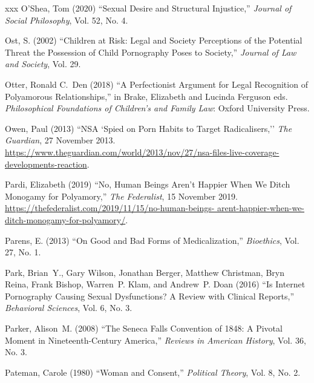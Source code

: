 \documentclass[]{jlreq} \usepackage{mystyle}
\begin{document}
\begin{thebibliography}{xxx}
O'Shea, Tom (2020) ``Sexual Desire and Structural Injustice,'' \textit{ Journal
  of Social Philosophy}, Vol. 52, No. 4.

Ost, S. (2002) ``Children at Risk: Legal and Society Perceptions of the
  Potential Threat the Possession of Child Pornography Poses to Society,''
  \textit{ Journal of Law and Society}, Vol. 29.

Otter, Ronald C.~Den (2018) ``A Perfectionist Argument for Legal Recognition of
  Polyamorous Relationships,'' in Brake, Elizabeth and Lucinda Ferguson eds.
  \textit{ Philosophical Foundations of Children's and Family Law}: Oxford
  University Press.

Owen, Paul (2013) ``NSA `Spied on Porn Habits to Target Radicalisers,''
  \emph{The Guardian}, 27 November 2013.
  \url{https://www.theguardian.com/world/2013/nov/27/nsa-files-live-coverage-developments-reaction}.

Pardi, Elizabeth (2019) ``No, Human Beings Aren't Happier When We Ditch
  Monogamy for Polyamory,'' \emph{The Federalist}, 15 November 2019.
  \url{https://thefederalist.com/2019/11/15/no-human-beings-
  arent-happier-when-we-ditch-monogamy-for-polyamory/}.

Parens, E. (2013) ``On Good and Bad Forms of Medicalization,'' \textit{
  Bioethics}, Vol. 27, No. 1.

Park, Brian~Y., Gary Wilson, Jonathan Berger, Matthew Christman, Bryn Reina,
  Frank Bishop, Warren~P. Klam, and Andrew~P. Doan (2016) ``Is Internet
  Pornography Causing Sexual Dysfunctions? A Review with Clinical Reports,''
  \textit{ Behavioral Sciences}, Vol. 6, No. 3.

Parker, Alison~M. (2008) ``The Seneca Falls Convention of 1848: A Pivotal
  Moment in Nineteenth-Century America,'' \textit{ Reviews in American
  History}, Vol. 36, No. 3.

Pateman, Carole (1980) ``Woman and Consent,'' \textit{ Political Theory}, Vol.
  8, No. 2.


\end{thebibliography}
\end{document}

